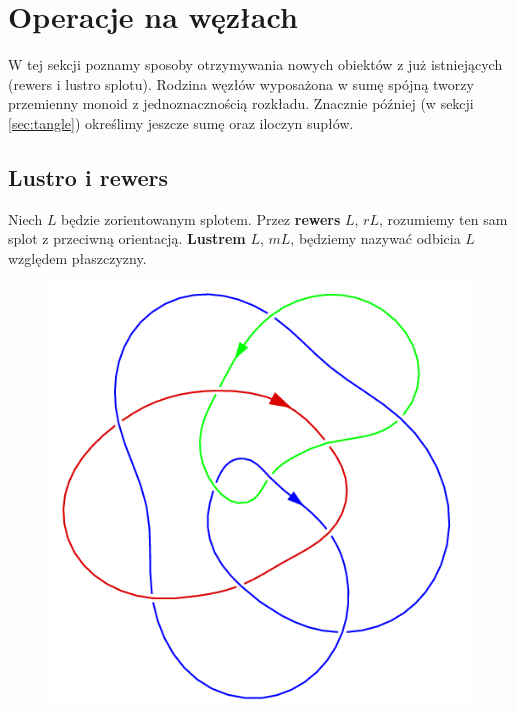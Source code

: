 \section{Operacje na węzłach} %
\label{sec:knot_operations}
W tej sekcji poznamy sposoby otrzymywania nowych obiektów z już istniejących (rewers i lustro splotu).
Rodzina węzłów wyposażona w sumę spójną tworzy przemienny monoid z jednoznacznością rozkładu.
Znacznie później (w sekcji \ref{sec:tangle}) określimy jeszcze sumę oraz iloczyn supłów.

\subsection{Lustro i rewers} %
\label{sub:single_operations}
\begin{definition}
    Niech $L$ będzie zorientowanym splotem.
    Przez \textbf{rewers} $L$, $rL$,
    rozumiemy ten sam splot z przeciwną orientacją.
    \textbf{Lustrem} $L$, $mL$,
    będziemy nazywać odbicia $L$ względem płaszczyzny.
    \begin{figure}[H]
        \begin{minipage}[b]{.32\linewidth}
            \centering
            \includegraphics[width=\linewidth]{../data/link_mirror.png}
        \end{minipage}

\end{figure}
\end{definition}
